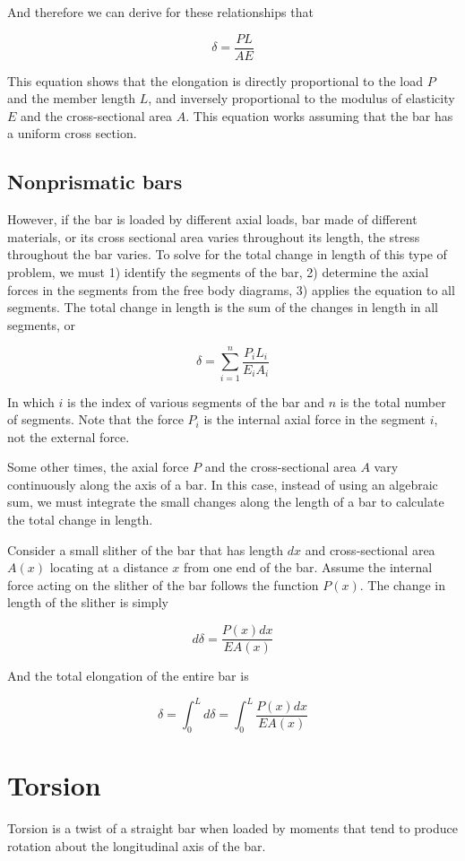 \documentclass[a4paper,openany,12pt]{book}
\begin{document}
And therefore we can derive for these relationships that

$$\delta  = \frac{PL}{AE}$$

This equation shows that the elongation is directly proportional to the
load \(P\) and the member length \(L\), and inversely proportional to the
modulus of elasticity \(E\) and the cross-sectional area \(A\). This
equation works assuming that the bar has a uniform cross section.

\subsection{Nonprismatic bars}
\label{sec:org8d74bad}
However, if the bar is loaded by different axial loads, bar made of
different materials, or its cross sectional area varies throughout its
length, the stress throughout the bar varies. To solve for the total
change in length of this type of problem, we must 1) identify the
segments of the bar, 2) determine the axial forces in the segments from
the free body diagrams, 3) applies the equation to all segments. The
total change in length is the sum of the changes in length in all
segments, or


$$\delta  = \sum\limits_{i = 1}^n \frac{P_iL_i}{E_iA_i}$$

In which \(i\) is the index of various segments of the bar and \(n\) is the
total number of segments. Note that the force \(P_i\) is the internal
axial force in the segment \(i\), not the external force.

Some other times, the axial force \(P\) and the cross-sectional area \(A\)
vary continuously along the axis of a bar. In this case, instead of
using an algebraic sum, we must integrate the small changes along the
length of a bar to calculate the total change in length.

Consider a small slither of the bar that has length \(dx\) and
cross-sectional area \(A(x)\) locating at a distance \(x\) from one end of
the bar. Assume the internal force acting on the slither of the bar
follows the function \(P(x)\). The change in length of the slither is
simply


$$d\delta  = \frac{P(x)dx}{EA(x)}$$

And the total elongation of the entire bar is

$$\delta  = \int_0^L {d\delta }  = \int_0^L \frac{P(x)dx}{EA(x)}$$

\section{Torsion}
\label{sec:org06340c5}
Torsion is a twist of a straight bar when loaded by moments that tend to
produce rotation about the longitudinal axis of the bar.
\end{document}
